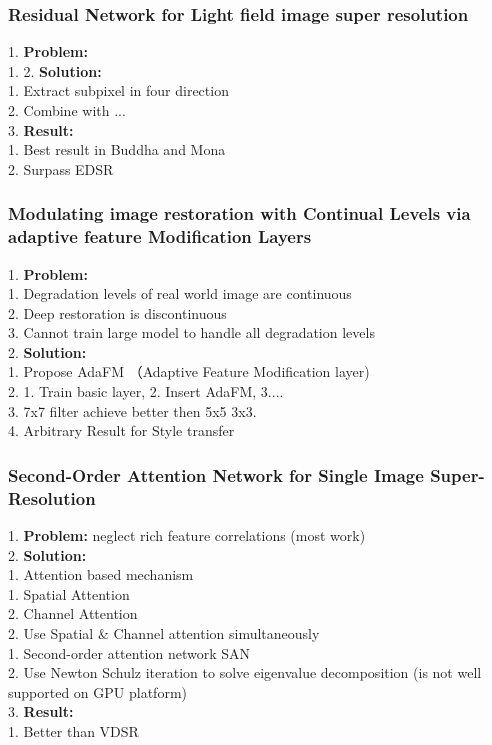 \subsubsection{Residual Network for Light field image super resolution}
    1. {\bf Problem:} \\
        1. 
    2. {\bf Solution:} \\
        1. Extract subpixel in four direction \\
        2. Combine with ... \\
    3. {\bf Result:} \\
        1. Best result in Buddha and Mona \\
        2. Surpass EDSR \\
\subsubsection{Modulating image restoration with Continual Levels via adaptive feature Modification Layers}
    1. {\bf Problem:} \\
        1. Degradation levels of real world image are continuous \\
        2. Deep restoration is discontinuous \\
        3. Cannot train large model to handle all degradation levels \\
    2. {\bf Solution:} \\
        1. Propose AdaFM （Adaptive Feature Modification layer) \\
        2. 1. Train basic layer, 2. Insert AdaFM, 3.... \\
        3. 7x7 filter achieve better then 5x5 3x3. \\
        4. Arbitrary Result for Style transfer \\
\subsubsection{Second-Order Attention Network for Single Image Super-Resolution}
    1. {\bf Problem:} neglect rich feature correlations (most work) \\
    2. {\bf Solution:} \\
        1. Attention based mechanism \\
            1. Spatial Attention \\
            2. Channel Attention \\
        2. Use Spatial & Channel attention simultaneously \\
            1. Second-order attention network SAN \\
            2. Use Newton Schulz iteration to solve eigenvalue decomposition (is not well supported on GPU platform) \\
    3. {\bf Result:} \\
        1. Better than VDSR \\
